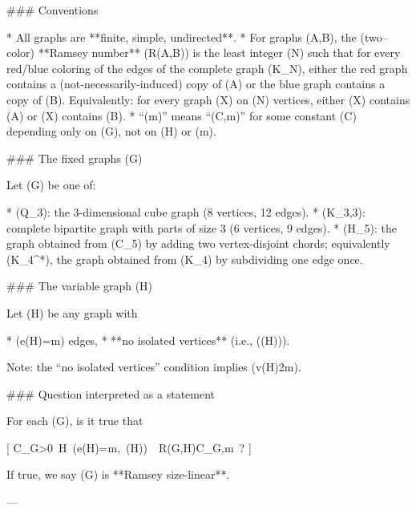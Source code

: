 ### Conventions

* All graphs are **finite, simple, undirected**.
* For graphs (A,B), the (two–color) **Ramsey number** (R(A,B)) is the least integer (N) such that for every red/blue coloring of the edges of the complete graph (K_N), either the red graph contains a (not-necessarily-induced) copy of (A) or the blue graph contains a copy of (B). Equivalently: for every graph (X) on (N) vertices, either (X) contains (A) or (\overline X) contains (B).
* “(\ll m)” means “(\le C,m)” for some constant (C) depending only on (G), not on (H) or (m).

### The fixed graphs (G)

Let (G) be one of:

* (Q_3): the 3-dimensional cube graph (8 vertices, 12 edges).
* (K_{3,3}): complete bipartite graph with parts of size 3 (6 vertices, 9 edges).
* (H_5): the graph obtained from (C_5) by adding two vertex-disjoint chords; equivalently (K_4^*), the graph obtained from (K_4) by subdividing one edge once.

### The variable graph (H)

Let (H) be any graph with

* (e(H)=m) edges,
* **no isolated vertices** (i.e., (\delta(H))).

Note: the “no isolated vertices” condition implies (v(H)\le 2m).

### Question interpreted as a statement

For each (G), is it true that

[
\exists C_G>0\ \forall H\ (e(H)=m,\ \delta(H))\ \Longrightarrow\ R(G,H)\le C_G,m\ ?
]

If true, we say (G) is **Ramsey size-linear**.

---

